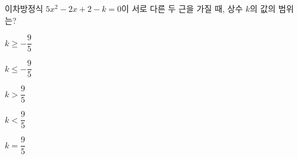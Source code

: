 이차방정식 $5x^2-2x+2-k=0$이 서로 다른 두 근을 가질 때, 상수 $k$의 값의 범위는?
\begin{choices32}{\rule[-3ex]{0pt}{8ex}$k\ge -\dfrac{9}{5}$}{\rule[-3ex]{0pt}{8ex}$k\le -\dfrac{9}{5}$}{\rule[-3ex]{0pt}{8ex}$k>\dfrac{9}{5}$}{\rule[-3ex]{0pt}{8ex}$k<\dfrac{9}{5}$}{\rule[-3ex]{0pt}{8ex}$k=\dfrac{9}{5}$}\end{choices32}
